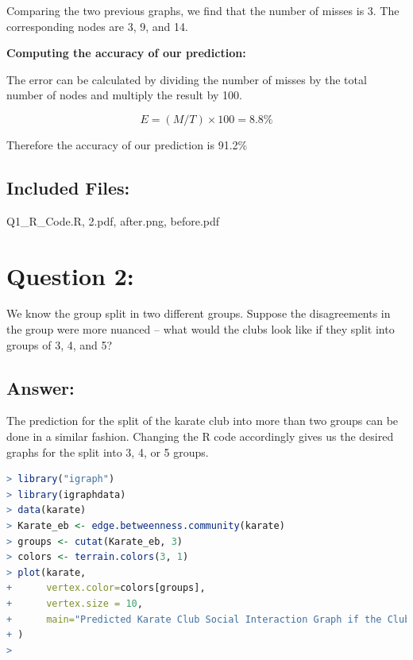 \documentclass[a4paper, 11pt]{article}
\begin{document}
Comparing the two previous graphs, we find that the number of misses is 3. The corresponding nodes are 3, 9, and 14.

\textbf{Computing the accuracy of our prediction:}

The error can be calculated by dividing the number of misses by the total number of nodes and multiply the result by 100.

$$ E = (M/T) \times 100 = 8.8\% $$

Therefore the accuracy of our prediction is 91.2\%

\subsection*{Included Files:}
Q1\_R\_Code.R, 2.pdf, after.png, before.pdf

\section*{Question 2:}
We know the group split in two different groups.  Suppose the
disagreements in the group were more nuanced -- what would the clubs
look like if they split into groups of 3, 4, and 5?

\subsection*{Answer:}
The prediction for the split of the karate club into more than two groups can be done in a similar fashion. Changing the R code accordingly gives us the desired graphs for the split into 3, 4, or 5 groups.

\begin{lstlisting}[language=R, breakatwhitespace=〈false), label=Predicted Karate Club Social Interaction Graph if the Club splits into 3 groups in R, caption= Predicted Karate Club Social Interaction Graph if the Club splits into 3 groups in R]
> library("igraph")
> library(igraphdata)
> data(karate)
> Karate_eb <- edge.betweenness.community(karate)
> groups <- cutat(Karate_eb, 3)
> colors <- terrain.colors(3, 1)
> plot(karate, 
+      vertex.color=colors[groups],
+      vertex.size = 10,
+      main="Predicted Karate Club Social Interaction Graph if the Club splits into 3 groups"
+ )
>
\end{lstlisting}
\end{document}
